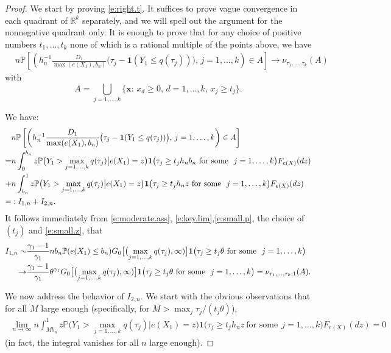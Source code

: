 \documentclass[12pt]{amsart}
\newcommand{\bbr}{\mathbb{R}}
\newcommand{\LFe}{F_{e(X)}}
\newcommand{\1}{\mathbbm{1}}
\newcommand{\0}{\mathbf{0}}
\newcommand{\one}{\mathbf{1}}
\theoremstyle{plain}
\theoremstyle{definition}
\newcommand{\bbP}{\mathbb{P}}
\newcommand{\bx}{\mathbf{x}}
\begin{document}
\begin{proof}
We start by proving \eqref{e:right.t}. It suffices to prove vague
convergence in each quadrant of $\bbr^k$ separately, and we will spell
out the argument for the nonnegative quadrant only. It is enough to
prove that for any choice of positive numbers $t_1,\ldots, t_k$ none of
which is a rational multiple of the points above, we have 
\begin{align} \label{eq:nuA}
&n\bbP\left[\left( h_n^{-1}\frac{D_1}{\max(e(X_1),b_n)}
  \bigl( \tau_j-\one(Y_1\leq q(\tau_j))\bigr), \, j=1,\ldots,
                                  k \right)\in A\right] \to 
                                  \nu_{\tau_1,\ldots, \tau_k}(A)
\end{align}
with
$$
A = \bigcup_{j=1,\ldots, k} \bigl\{ \bx:\, x_d\geq 0, \, d=1,\ldots,
k, \, x_j\geq t_j\bigr\}.
$$

We have: 
\begin{align*} 
&  n\bbP\left[\left( h_n^{-1}\frac{D_1}{\max(e(X_1),b_n)}
  \bigl( \tau_j-\one(Y_1\leq q(\tau_j))\bigr), \, j=1,\ldots,
                                  k \right)\in A\right]\\
\notag =&n\int_0^{b_n} z\bbP\bigl(   Y_1> \max_{j=1,\ldots, k} q(\tau_j)
          \big| e(X_1)=z\bigr) \one \bigl( \tau_j\geq t_jh_nb_n \
          \text{for some} \ \ j=1,\ldots, k\bigr) \LFe(dz)\\ 
  \notag +& n\int_{b_n}^1 z\bbP\bigl(   Y_1> \max_{j=1,\ldots, k} q(\tau_j)
          \big| e(X_1)=z\bigr) \one \bigl( \tau_j\geq t_jh_nz \
          \text{for some} \ \ j=1,\ldots, k\bigr) \LFe(dz)  \\
\notag =&: I_{1,n}+I_{2,n}.
\end{align*}
%
It follows immediately from \eqref{e:moderate.ass}, \eqref{e:key.lim},\eqref{e:small.p},  
the choice of $(t_j)$ and
\eqref{e:small.z}, that 
%
\begin{align} \label{e:trea.I1n}
 I_{1,n} \sim& \frac{\gamma_1-1}{\gamma_1} n b_n 
   \bbP(e(X_1)\leq b_n)  G_0\bigl[\bigl( \max_{j=1,\ldots, k} q(\tau_j),
               \infty)\bigr] \one \bigl( \tau_j\geq t_j\theta \
          \text{for some} \ \ j=1,\ldots, k\bigr)
\\
   \notag  \to& \frac{\gamma_1-1}{\gamma_1}\theta^{\gamma_1}  
G_0\bigl[\bigl( \max_{j=1,\ldots, k} q(\tau_j),
               \infty)\bigr] \one \bigl( \tau_j\geq t_j\theta \
          \text{for some} \ \ j=1,\ldots, k\bigr)
= \nu_{\tau_1,\ldots,\tau_k;1}(A). 
\end{align}
 

We now address the behavior of $I_{2,n}$. We start with the obvious
observations that for all $M$ large enough (specifically, for
$M>\max_j\tau_j/(t_j\theta)$), 
\begin{align} \label{I.2n.M}
\  \lim_{n\to\infty} n  \int_{Mb_n}^1 z\bbP\bigl(   Y_1> \max_{j=1,\ldots, k} q(\tau_j)
          \big| e(X_1)=z\bigr) \one \bigl( \tau_j\geq t_jh_nz \
          \text{for some} \ \ j=1,\ldots, k\bigr) \LFe(dz)  =0
\end{align}
(in fact, the integral vanishes for all $n$ large enough). 


\end{proof}
\end{document}
